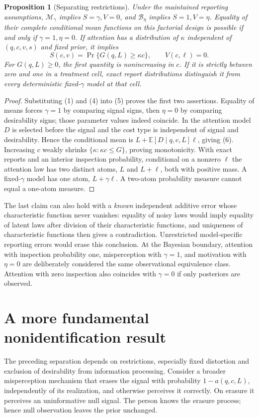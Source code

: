 \documentclass[11pt]{article}
\newtheorem{proposition}[theorem]{Proposition}
\theoremstyle{remark}
\newcommand{\E}{\mathbb E}
\begin{document}
\begin{proposition}[Separating restrictions]
Under the maintained reporting assumptions, $\mathcal M_\gamma$ implies $S=\gamma,V=0$, and $\mathcal B_\eta$ implies $S=1,V=\eta$. Equality of their complete conditional mean functions on this factorial design is possible if and only if $\gamma=1,\eta=0$. If attention has a distribution of $\kappa$ independent of $(q,c,v,s)$ and fixed prior, it implies
\[
 S(c,v)=\Pr\{G(q,L)\geq\kappa c\},\qquad V(c,\ell)=0.     \tag{6}
\]
For $G(q,L)\geq0$, the first quantity is nonincreasing in $c$. If it is strictly between zero and one in a treatment cell, exact report distributions distinguish it from every deterministic fixed-$\gamma$ model at that cell.
\end{proposition}
\begin{proof}
Substituting (1) and (4) into (5) proves the first two assertions. Equality of means forces $\gamma=1$ by comparing signal signs, then $\eta=0$ by comparing desirability signs; those parameter values indeed coincide. In the attention model $D$ is selected before the signal and the cost type is independent of signal and desirability. Hence the conditional mean is $L+\E[D\mid q,c,L]\ell$, giving (6). Increasing $c$ weakly shrinks $\{\kappa:\kappa c\leq G\}$, proving monotonicity. With exact reports and an interior inspection probability, conditional on a nonzero $\ell$ the attention law has two distinct atoms, $L$ and $L+\ell$, both with positive mass. A fixed-$\gamma$ model has one atom, $L+\gamma\ell$. A two-atom probability measure cannot equal a one-atom measure.
\end{proof}

The last claim can also hold with a \emph{known} independent additive error whose characteristic function never vanishes: equality of noisy laws would imply equality of latent laws after division of their characteristic functions, and uniqueness of characteristic functions then gives a contradiction. Unrestricted model-specific reporting errors would erase this conclusion. At the Bayesian boundary, attention with inspection probability one, misperception with $\gamma=1$, and motivation with $\eta=0$ are deliberately considered the same observational equivalence class. Attention with zero inspection also coincides with $\gamma=0$ if only posteriors are observed.

\section{A more fundamental nonidentification result}
The preceding separation depends on restrictions, especially fixed distortion and exclusion of desirability from information processing. Consider a broader misperception mechanism that erases the signal with probability $1-a(q,c,L)$, independently of its realization, and otherwise perceives it correctly. On erasure it perceives an uninformative null signal. The person knows the erasure process; hence null observation leaves the prior unchanged.
\end{document}
